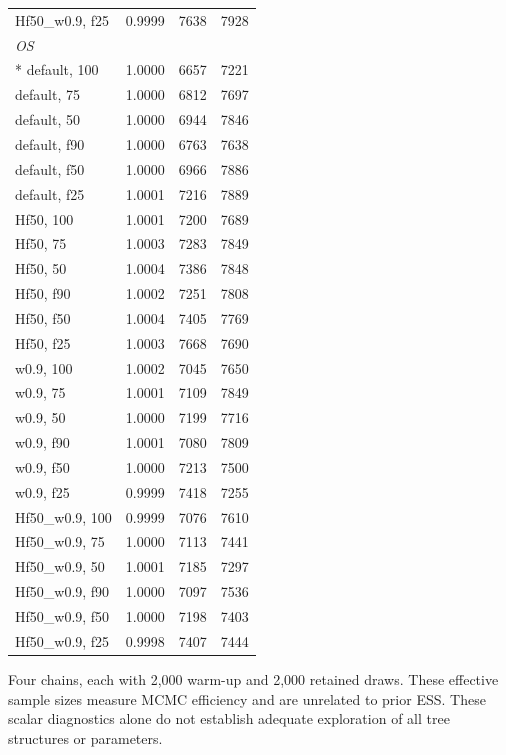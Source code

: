 \begin{longtable}{lrrr}
Hf50\_w0.9, f25 & 0.9999 & 7638 & 7928 \\
\multicolumn{4}{l}{\strut\textit{OS}}\\*
default, 100 & 1.0000 & 6657 & 7221 \\
default, 75 & 1.0000 & 6812 & 7697 \\
default, 50 & 1.0000 & 6944 & 7846 \\
default, f90 & 1.0000 & 6763 & 7638 \\
default, f50 & 1.0000 & 6966 & 7886 \\
default, f25 & 1.0001 & 7216 & 7889 \\
Hf50, 100 & 1.0001 & 7200 & 7689 \\
Hf50, 75 & 1.0003 & 7283 & 7849 \\
Hf50, 50 & 1.0004 & 7386 & 7848 \\
Hf50, f90 & 1.0002 & 7251 & 7808 \\
Hf50, f50 & 1.0004 & 7405 & 7769 \\
Hf50, f25 & 1.0003 & 7668 & 7690 \\
w0.9, 100 & 1.0002 & 7045 & 7650 \\
w0.9, 75 & 1.0001 & 7109 & 7849 \\
w0.9, 50 & 1.0000 & 7199 & 7716 \\
w0.9, f90 & 1.0001 & 7080 & 7809 \\
w0.9, f50 & 1.0000 & 7213 & 7500 \\
w0.9, f25 & 0.9999 & 7418 & 7255 \\
Hf50\_w0.9, 100 & 0.9999 & 7076 & 7610 \\
Hf50\_w0.9, 75 & 1.0000 & 7113 & 7441 \\
Hf50\_w0.9, 50 & 1.0001 & 7185 & 7297 \\
Hf50\_w0.9, f90 & 1.0000 & 7097 & 7536 \\
Hf50\_w0.9, f50 & 1.0000 & 7198 & 7403 \\
Hf50\_w0.9, f25 & 0.9998 & 7407 & 7444 \\
\end{longtable}
\noindent\begin{minipage}{\linewidth}\footnotesize Four chains, each with 2,000 warm-up and 2,000 retained draws. These effective sample sizes measure MCMC efficiency and are unrelated to prior ESS. These scalar diagnostics alone do not establish adequate exploration of all tree structures or parameters.\end{minipage}
\endgroup
